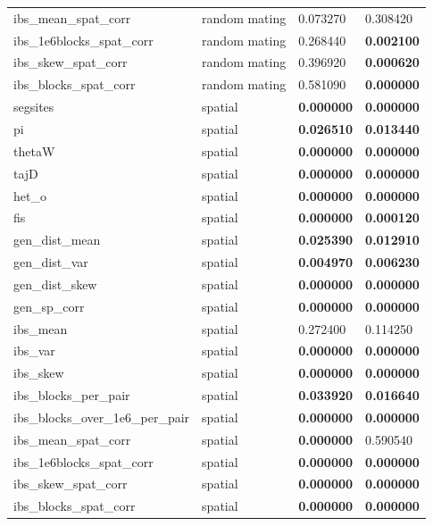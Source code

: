 \documentclass[11pt,twoside,lineno]{preprint}
\begin{document}
\begin{table}[htbp]
\begin{tableminipage}{\textwidth}
\begin{tabularx}{\textwidth}{XXXX}
ibs\_mean\_spat\_corr & random mating & 0.073270 & 0.308420 \\ 
ibs\_1e6blocks\_spat\_corr & random mating & 0.268440 & \textbf{0.002100} \\ 
ibs\_skew\_spat\_corr & random mating & 0.396920 & \textbf{0.000620} \\ 
ibs\_blocks\_spat\_corr & random mating & 0.581090 & \textbf{0.000000} \\ 
segsites & spatial & \textbf{0.000000} & \textbf{0.000000} \\ 
pi & spatial & \textbf{0.026510} & \textbf{0.013440} \\ 
thetaW & spatial & \textbf{0.000000} & \textbf{0.000000} \\ 
tajD & spatial & \textbf{0.000000} & \textbf{0.000000} \\ 
het\_o & spatial & \textbf{0.000000} & \textbf{0.000000} \\ 
fis & spatial & \textbf{0.000000} & \textbf{0.000120} \\ 
gen\_dist\_mean & spatial & \textbf{0.025390} & \textbf{0.012910} \\ 
gen\_dist\_var & spatial & \textbf{0.004970} & \textbf{0.006230} \\ 
gen\_dist\_skew & spatial & \textbf{0.000000} & \textbf{0.000000} \\ 
gen\_sp\_corr & spatial & \textbf{0.000000} & \textbf{0.000000} \\ 
ibs\_mean & spatial & 0.272400 & 0.114250 \\ 
ibs\_var & spatial & \textbf{0.000000} & \textbf{0.000000} \\ 
ibs\_skew & spatial & \textbf{0.000000} & \textbf{0.000000} \\ 
ibs\_blocks\_per\_pair & spatial & \textbf{0.033920} & \textbf{0.016640} \\ 
ibs\_blocks\_over\_1e6\_per\_pair & spatial & \textbf{0.000000} & \textbf{0.000000} \\ 
ibs\_mean\_spat\_corr & spatial & \textbf{0.000000} & 0.590540 \\ 
ibs\_1e6blocks\_spat\_corr & spatial & \textbf{0.000000} & \textbf{0.000000} \\ 
ibs\_skew\_spat\_corr & spatial & \textbf{0.000000} & \textbf{0.000000} \\ 
ibs\_blocks\_spat\_corr & spatial & \textbf{0.000000} & \textbf{0.000000} \\ 
\hline
\end{tabularx}
\end{tableminipage}
\label{table:sampling}
\end{table}
\end{document}
